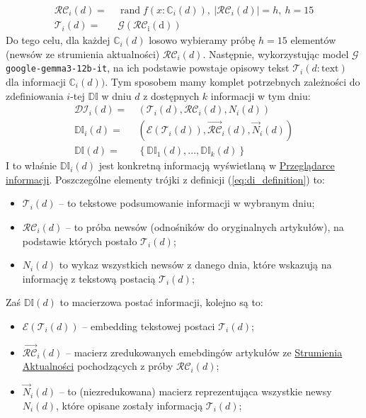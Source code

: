 \begin{equation}
    \begin{aligned}
        \mathcal{RC}_{i}(d) = & \: \operatorname*{rand}f(x: \mathbb{C}_{i}(d)), \: |\mathcal{RC}_{i}(d)| = h, \: h = 15 \\
        \mathcal{T}_{i}(d) = & \: \mathrm{\mathcal{G}(\mathcal{RC}_{i}(d))}
    \end{aligned}
\end{equation}
Do tego celu, dla każdej $\mathbb{C}_{i}(d)$ losowo wybieramy próbę $h = 15$ elementów (newsów ze strumienia 
aktualności) $\mathcal{RC}_{i}(d)$. Następnie, wykorzystując model $\mathcal{G}$ \texttt{google-gemma3-12b-it}, 
na ich podstawie powstaje opisowy tekst $\mathcal{T}_{i}(d: \text{text})$ dla informacji $\mathbb{C}_{i}(d))$. 
Tym sposobem mamy komplet potrzebnych zależności do zdefiniowania $i$-tej $\mathbb{DI}$ w dniu $d$ 
z dostępnych $k$ informacji w tym dniu:
\begin{equation} \label{eq:di_definition}
    \begin{aligned}
        \mathcal{DI}_{i}(d) = \: &\left( 
            \mathcal{T}_{i}(d), 
            \mathcal{RC}_{i}(d), 
            N_{i}(d)
        \right) \\
        \mathbb{DI}_{i}(d) = \: &\left( 
            \mathcal{E}(\mathcal{T}_{i}(d)),
            \vec{\mathcal{RC}}_{i}(d), 
            \vec{N}_{i}(d)
        \right) \\
        \mathbb{DI}(d) = \: &\left\{
            \mathbb{DI}_{1}(d), ..., \mathbb{DI}_{k}(d)
        \right\}
    \end{aligned}
\end{equation}
I to właśnie $\mathbb{DI}_{i}(d)$ jest konkretną informacją wyświetlaną w 
\href{https://playground.radlab.dev/Przegl%C4%85darka_Informacji}{Przeglądarce informacji}.
Poszczególne elementy trójki z definicji (\ref{eq:di_definition}) to:
\begin{itemize}
    \item $\mathcal{T}_{i}(d)$ -- to tekstowe podsumowanie informacji w wybranym dniu;
    \item $\mathcal{RC}_{i}(d)$ -- to próba newsów (odnośników do oryginalnych artykułów), 
    na podstawie których postało $\mathcal{T}_{i}(d)$;
    \item $N_{i}(d)$ to wykaz wszystkich newsów z danego dnia, które wskazują na informację 
    z tekstową postacią $\mathcal{T}_{i}(d)$;
\end{itemize}
Zaś $\mathbb{DI}(d)$ to macierzowa postać informacji, kolejno są to:
\begin{itemize}
    \item $\mathcal{E}(\mathcal{T}_{i}(d))$ -- embedding tekstowej postaci $\mathcal{T}_{i}(d)$;
    \item $\vec{\mathcal{RC}}_{i}(d)$ -- macierz zredukowanych emebdingów artykułów ze 
    \href{https://playground.radlab.dev/Strumie%C5%84_Aktualno%C5%9Bci}{Strumienia Aktualności}
    pochodzących z próby $\mathcal{RC}_{i}(d)$;
    \item $\vec{N}_{i}(d)$ -- to (niezredukowana) macierz reprezentująca wszystkie 
    newsy $N_{i}(d)$, które opisane zostały informacją $\mathcal{T}_{i}(d)$;
\end{itemize}